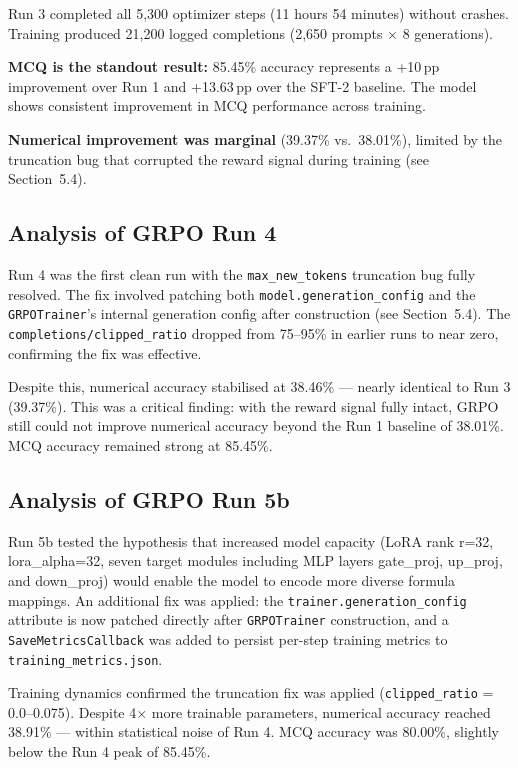 \documentclass[12pt]{report}
\begin{document}
Run 3 completed all 5,300 optimizer steps (11 hours 54 minutes) without crashes. Training produced 21,200 logged completions (2,650 prompts $\times$ 8 generations).

\textbf{MCQ is the standout result:} 85.45\% accuracy represents a +10\,pp improvement over Run 1 and +13.63\,pp over the SFT-2 baseline. The model shows consistent improvement in MCQ performance across training.

\textbf{Numerical improvement was marginal} (39.37\% vs.\ 38.01\%), limited by the truncation bug that corrupted the reward signal during training (see Section~5.4).

\subsection{Analysis of GRPO Run 4}

Run 4 was the first clean run with the \texttt{max\_new\_tokens} truncation bug fully resolved. The fix involved patching both \texttt{model.generation\_config} and the \texttt{GRPOTrainer}'s internal generation config after construction (see Section~5.4). The \texttt{completions/\allowbreak clipped\_ratio} dropped from 75--95\% in earlier runs to near zero, confirming the fix was effective.

Despite this, numerical accuracy stabilised at 38.46\% --- nearly identical to Run 3 (39.37\%). This was a critical finding: with the reward signal fully intact, GRPO still could not improve numerical accuracy beyond the Run 1 baseline of 38.01\%. MCQ accuracy remained strong at 85.45\%.

\subsection{Analysis of GRPO Run 5b}

Run 5b tested the hypothesis that increased model capacity (LoRA rank r=32, lora\_alpha=32, seven target modules including MLP layers gate\_proj, up\_proj, and down\_proj) would enable the model to encode more diverse formula mappings. An additional fix was applied: the \texttt{trainer.generation\_config} attribute is now patched directly after \texttt{GRPOTrainer} construction, and a \texttt{SaveMetricsCallback} was added to persist per-step training metrics to \texttt{training\_metrics.json}.

Training dynamics confirmed the truncation fix was applied (\texttt{clipped\_ratio} = 0.0--0.075). Despite 4$\times$ more trainable parameters, numerical accuracy reached 38.91\% --- within statistical noise of Run 4. MCQ accuracy was 80.00\%, slightly below the Run 4 peak of 85.45\%.
\end{document}

